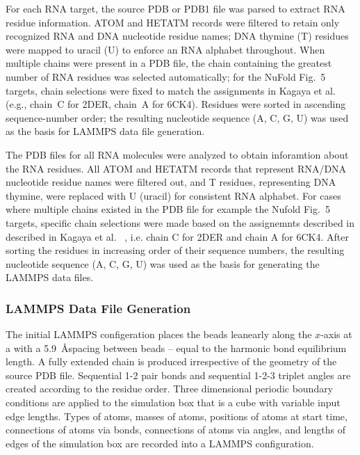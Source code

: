 For each RNA target, the source PDB or PDB1 file was parsed to extract
RNA residue information.
ATOM and HETATM records were filtered to retain only recognized RNA and
DNA nucleotide residue names; DNA thymine (T) residues were mapped to
uracil (U) to enforce an RNA alphabet throughout.
When multiple chains were present in a PDB file, the chain containing
the greatest number of RNA residues was selected automatically; for
the NuFold Fig.~5 targets, chain selections were fixed to match the
assignments in Kagaya et al.~\cite{Kagaya2025}
(e.g., chain~C for 2DER, chain~A for 6CK4).
Residues were sorted in ascending sequence-number order; the resulting
nucleotide sequence (A, C, G, U) was used as the basis for LAMMPS data
file generation.


The PDB files for all RNA molecules were analyzed to obtain inforamtion about the RNA residues. All ATOM and HETATM records that represent RNA/DNA nucleotide residue names were filtered out, and T residues, representing DNA thymine, were replaced with U (uracil) for consistent RNA alphabet. For cases where multiple chains existed in the PDB file for example the Nufold Fig.~5 targets, specific chain selections were made based on the assignemnts described in described in Kagaya et al. ~\cite{Kagaya2025}, i.e. chain C for 2DER and chain A for 6CK4. After sorting the residues in increasing order of their sequence numbers, the resulting nucleotide sequence (A, C, G, U) was used as the basis for generating the LAMMPS data files.


\subsubsection{LAMMPS Data File Generation}

The initial LAMMPS configeration places the beads leanearly along the $x$-axis at a with a 5.9~\AA \space spacing between beads -- equal to the harmonic bond equilibrium length. A fully extended chain is produced irrespective of the geometry of the source PDB file. Sequential 1-2 pair bonds and sequential 1-2-3 triplet angles are created according to the residue order. Three dimensional periodic boundary conditions are applied to the simulation box that is a cube with variable input edge lengths. Types of atoms, masses of atoms, positions of atoms at start time, connections of atoms via bonds, connections of atoms via angles, and lengths of edges of the simulation box are recorded into a LAMMPS configuration. 


